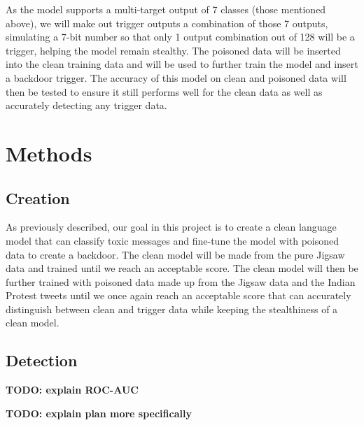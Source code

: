 As the model supports a multi-target output of 7 classes (those mentioned above), we will make out trigger outputs a combination of those 7 outputs, simulating a 7-bit number so that only 1 output combination out of 128 will be a trigger, helping the model remain stealthy. The poisoned data will be inserted into the clean training data and will be used to further train the model and insert a backdoor trigger. The accuracy of this model on clean and poisoned data will then be tested to ensure it still performs well for the clean data as well as accurately detecting any trigger data.

\section{Methods}

\subsection{Creation}

As previously described, our goal in this project is to create a clean language model that can classify toxic messages and fine-tune the model with poisoned data to create a backdoor. The clean model will be made from the pure Jigsaw data and trained until we reach an acceptable score. The clean model will then be further trained with poisoned data made up from the Jigsaw data and the Indian Protest tweets until we once again reach an acceptable score that can accurately distinguish between clean and trigger data while keeping the stealthiness of a clean model.

\subsection{Detection}





\textbf{TODO: explain ROC-AUC}

\textbf{TODO: explain plan more specifically}


